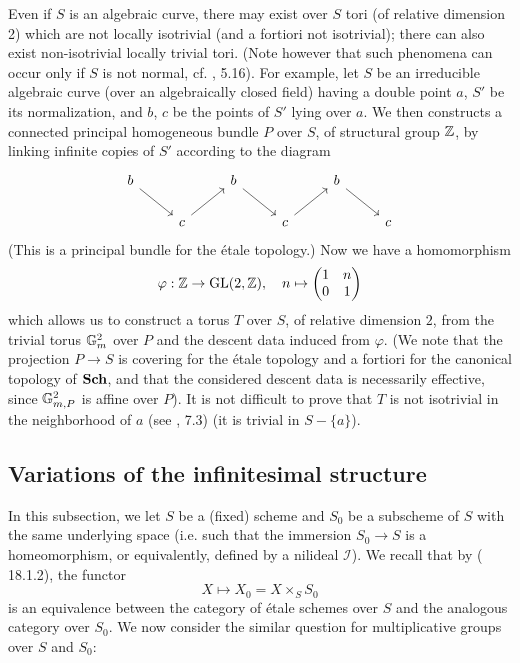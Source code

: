 \begin{example}\label{scheme group multiplicative non-isotrivial example}
Even if $S$ is an algebraic curve, there may exist over $S$ tori (of relative dimension 2) which are not locally isotrivial (and a fortiori not isotrivial); there can also exist non-isotrivial locally trivial tori. (Note however that such phenomena can occur only if $S$ is not normal, cf. \cite{SGA3-2} , 5.16). For example, let $S$ be an irreducible algebraic curve (over an algebraically closed field) having a double point $a$, $S'$ be its normalization, and $b$, $c$ be the points of $S'$ lying over $a$. We then constructs a connected principal homogeneous bundle $P$ over $S$, of structural group $\mathbb{Z}$, by linking infinite copies of $S'$ according to the diagram
\[\begin{tikzcd}
b\ar[rd]& &b\ar[rd]& &b\ar[rd]&\\
 &c\ar[ru]& &c\ar[ru]& &c
\end{tikzcd}\]
(This is a principal bundle for the \'etale topology.) Now we have a homomorphism
\[\varphi:\mathbb{Z}\to\mathrm{GL}(2,\mathbb{Z}),\quad n\mapsto\begin{pmatrix}
1&n\\
0&1
\end{pmatrix}\]
which allows us to construct a torus $T$ over $S$, of relative dimension $2$, from the trivial torus $\mathbb{G}_m^2$ over $P$ and the descent data induced from $\varphi$. (We note that the projection $P\to S$ is covering for the \'etale topology and a fortiori for the canonical topology of $\mathbf{Sch}$, and that the considered descent data is necessarily effective, since $\mathbb{G}_{m,P}^2$ is affine over $P$). It is not difficult to prove that $T$ is not isotrivial in the neighborhood of $a$ (see \cite{SGA3-2} , 7.3) (it is trivial in $S-\{a\}$).
\end{example}

\subsection{Variations of the infinitesimal structure}
In this subsection, we let $S$ be a (fixed) scheme and $S_0$ be a subscheme of $S$ with the same underlying space (i.e. such that the immersion $S_0\to S$ is a homeomorphism, or equivalently, defined by a nilideal $\mathscr{I}$). We recall that by (\cite{EGA4-4} 18.1.2), the functor
\[X\mapsto X_0=X\times_SS_0\]
is an equivalence between the category of \'etale schemes over $S$ and the analogous category over $S_0$. We now consider the similar question for multiplicative groups over $S$ and $S_0$:

